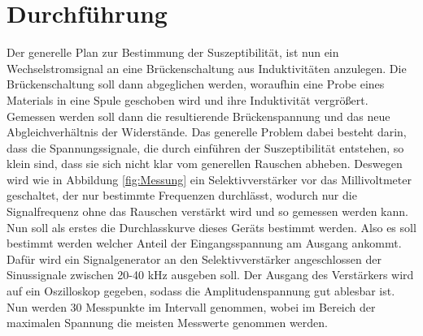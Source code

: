 \section{Durchführung}
\label{sec:Durchführung}
Der generelle Plan zur Bestimmung der Suszeptibilität, ist nun ein Wechselstromsignal an eine
Brückenschaltung aus Induktivitäten anzulegen. Die Brückenschaltung soll dann abgeglichen werden, woraufhin eine Probe eines
Materials in eine Spule geschoben wird und ihre Induktivität vergrößert. Gemessen werden soll dann die resultierende Brückenspannung
und das neue Abgleichverhältnis der Widerstände. Das generelle Problem dabei besteht darin, dass die Spannungssignale, die durch einführen der Suszeptibilität entstehen,
so klein sind, dass sie sich nicht klar vom generellen Rauschen abheben. Deswegen wird wie in Abbildung \ref{fig:Messung}
ein Selektivverstärker vor das Millivoltmeter geschaltet, der nur bestimmte Frequenzen durchlässt, wodurch nur die Signalfrequenz ohne das Rauschen verstärkt wird und so gemessen werden kann. Nun soll als erstes die
Durchlasskurve dieses Geräts bestimmt werden. Also es soll bestimmt werden welcher Anteil der Eingangsspannung am Ausgang ankommt.
Dafür wird ein Signalgenerator an den Selektivverstärker angeschlossen der Sinussignale zwischen 20-40 kHz ausgeben soll.
Der Ausgang des Verstärkers wird auf ein Oszilloskop gegeben, sodass die Amplitudenspannung gut ablesbar ist. Nun werden 30 Messpunkte im Intervall
genommen, wobei im Bereich der maximalen Spannung die meisten Messwerte genommen werden.\\

